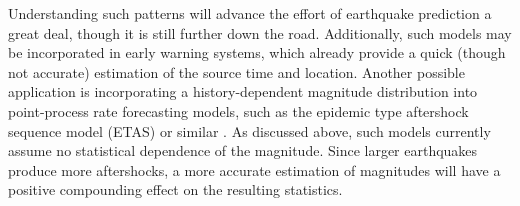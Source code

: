 \documentclass[pdflatex]{sn-jnl}
\begin{document}
Understanding such patterns will advance the effort of earthquake prediction a great deal\cite{mousavi_deep-learning_2022, mousavi_machine_2023, mignan_neural_2020, karimpouli_explainable_2023, bergen_machine_2019}, though it is still further down the road.
Additionally, such models may be incorporated in early warning systems, which already provide a quick (though not accurate) estimation of the source time and location. 
Another possible application is incorporating a history-dependent magnitude distribution into point-process rate forecasting models, such as the epidemic type aftershock sequence model (ETAS) or similar \cite{ogata_statistical_1988, ogata_statistics_2017, dascher-cousineau_using_2023}. As discussed above, such models currently assume no statistical dependence of the magnitude. Since larger earthquakes produce more aftershocks, a more accurate estimation of magnitudes will have a positive compounding effect on the resulting statistics.




\let\oldbibliography\thebibliography
\renewcommand{\thebibliography}[1]{%
  \oldbibliography{#1}%
  \setlength{\itemsep}{10pt}%
}
% 
% 
\newpage


\let\oldthebibliography=\thebibliography
\let\oldendthebibliography=\endthebibliography
\renewenvironment{thebibliography}[1]{
    \oldthebibliography{#1}
    \setcounter{enumiv}{62}
}{\oldendthebibliography}
\end{document}
